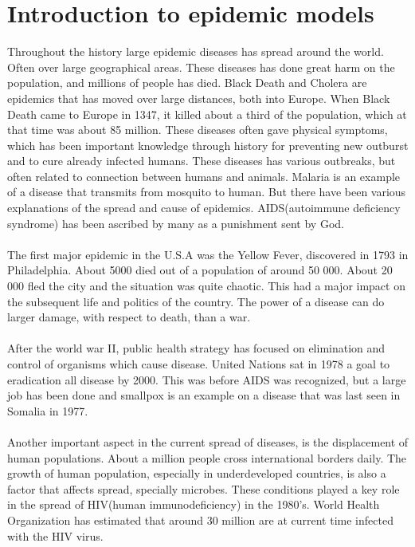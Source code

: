 \documentclass[%
twoside,                 %
final,                   %
10pt]{article}
\begin{document}
\section{Introduction to epidemic models}
Throughout the history large epidemic diseases has spread around the world. Often over large geographical areas. These diseases has done great harm on the population, and millions of people has died. Black Death and Cholera are epidemics that has moved over large distances, both into Europe. When Black Death came to Europe in 1347, it killed about a third of the population, which at that time was about 85 million. These diseases often gave physical symptoms, which has been important knowledge through history for preventing new outburst and to cure already infected humans. These diseases has various outbreaks, but often related to connection between humans and animals. Malaria is an example of a disease that transmits from mosquito to human. But there have been various explanations of the spread and cause of epidemics. AIDS(autoimmune deficiency syndrome) has been ascribed by many as a punishment sent by God.
\\
\\
The first major epidemic in the U.S.A was the Yellow Fever, discovered in 1793 in Philadelphia. About 5000 died out of a population of around 50 000. About 20 000 fled the city and the situation was quite chaotic. This had a major impact on the subsequent life and politics of the country. The power of a disease can do larger damage, with respect to death, than a war.
\\
\\
After the world war II, public health strategy has focused on elimination and control of organisms which cause disease. United Nations sat in 1978 a goal to eradication all disease by 2000. This was before AIDS was recognized, but a large job has been done and smallpox is an example on a disease that was last seen in Somalia in 1977.
\\
\\
Another important aspect in the current spread of diseases, is the displacement of human populations. About a million people cross international borders daily. The growth of human population, especially in underdeveloped countries, is also a factor that affects spread, specially microbes. These conditions played a key role in the spread of HIV(human immunodeficiency) in the 1980's. World Health Organization has estimated that around 30 million are at current time infected with the HIV virus.
\\
\end{document}
